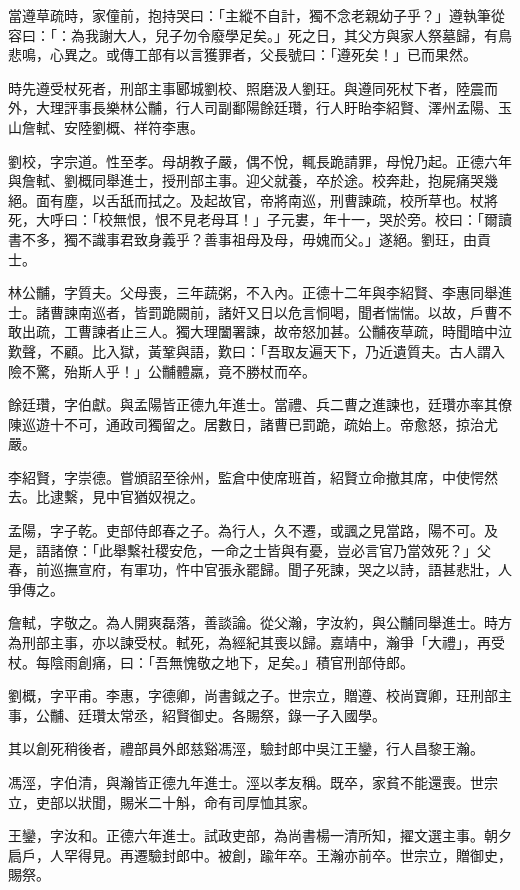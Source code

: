 \begin{pinyinscope}
當遵草疏時，家僮前，抱持哭曰：「主縱不自計，獨不念老親幼子乎？」遵執筆從容曰：「：為我謝大人，兒子勿令廢學足矣。」死之日，其父方與家人祭墓歸，有鳥悲鳴，心異之。或傳工部有以言獲罪者，父長號曰：「遵死矣！」已而果然。

時先遵受杖死者，刑部主事郾城劉校、照磨汲人劉玨。與遵同死杖下者，陸震而外，大理評事長樂林公黼，行人司副鄱陽餘廷瓚，行人盱眙李紹賢、澤州孟陽、玉山詹軾、安陸劉概、祥符李惠。

劉校，字宗道。性至孝。母胡教子嚴，偶不悅，輒長跪請罪，母悅乃起。正德六年與詹軾、劉概同舉進士，授刑部主事。迎父就養，卒於途。校奔赴，抱屍痛哭幾絕。面有塵，以舌舐而拭之。及起故官，帝將南巡，刑曹諫疏，校所草也。杖將死，大呼曰：「校無恨，恨不見老母耳！」子元婁，年十一，哭於旁。校曰：「爾讀書不多，獨不識事君致身義乎？善事祖母及母，毋媿而父。」遂絕。劉玨，由貢士。

林公黼，字質夫。父母喪，三年蔬粥，不入內。正德十二年與李紹賢、李惠同舉進士。諸曹諫南巡者，皆罰跪闕前，諸奸又日以危言恫喝，聞者惴惴。以故，戶曹不敢出疏，工曹諫者止三人。獨大理闔署諫，故帝怒加甚。公黼夜草疏，時聞暗中泣歎聲，不顧。比入獄，黃鞏與語，歎曰：「吾取友遍天下，乃近遺質夫。古人謂入險不驚，殆斯人乎！」公黼體羸，竟不勝杖而卒。

餘廷瓚，字伯獻。與孟陽皆正德九年進士。當禮、兵二曹之進諫也，廷瓚亦率其僚陳巡遊十不可，通政司獨留之。居數日，諸曹已罰跪，疏始上。帝愈怒，掠治尤嚴。

李紹賢，字崇德。嘗頒詔至徐州，監倉中使席班首，紹賢立命撤其席，中使愕然去。比逮繫，見中官猶奴視之。

孟陽，字子乾。吏部侍郎春之子。為行人，久不遷，或諷之見當路，陽不可。及是，語諸僚：「此舉繫社稷安危，一命之士皆與有憂，豈必言官乃當效死？」父春，前巡撫宣府，有軍功，忤中官張永罷歸。聞子死諫，哭之以詩，語甚悲壯，人爭傳之。

詹軾，字敬之。為人開爽磊落，善談論。從父瀚，字汝約，與公黼同舉進士。時方為刑部主事，亦以諫受杖。軾死，為經紀其喪以歸。嘉靖中，瀚爭「大禮」，再受杖。每陰雨創痛，曰：「吾無愧敬之地下，足矣。」積官刑部侍郎。

劉概，字平甫。李惠，字德卿，尚書鉞之子。世宗立，贈遵、校尚寶卿，玨刑部主事，公黼、廷瓚太常丞，紹賢御史。各賜祭，錄一子入國學。

其以創死稍後者，禮部員外郎慈谿馮涇，驗封郎中吳江王鑾，行人昌黎王瀚。

馮涇，字伯清，與瀚皆正德九年進士。涇以孝友稱。既卒，家貧不能還喪。世宗立，吏部以狀聞，賜米二十斛，命有司厚恤其家。

王鑾，字汝和。正德六年進士。試政吏部，為尚書楊一清所知，擢文選主事。朝夕扃戶，人罕得見。再遷驗封郎中。被創，踰年卒。王瀚亦前卒。世宗立，贈御史，賜祭。


\end{pinyinscope}
